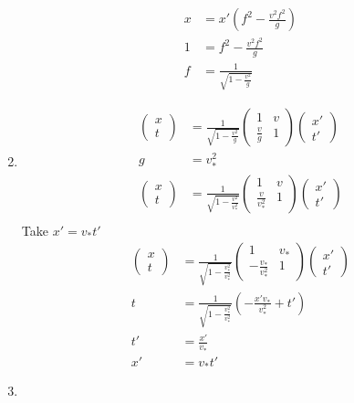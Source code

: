 \documentclass[11pt,letterpaper, twocolumn]{article}
\begin{document}
\begin{enumerate}[label=(\alph*)]
\begin{align*}
        x &= x'(f^2-\frac{v^2f^2}{g})\\
        1&=f^2-\frac{v^2f^2}{g}\\
        f&=\frac{1}{\sqrt{1-\frac{v^2}{g}}}
    \end{align*}
    \item\begin{align*}
        \begin{pmatrix}x\\t\end{pmatrix}&= \frac{1}{\sqrt{1-\frac{v^2}{g}}}\begin{pmatrix}1 & v \\ \frac{v}{g} & 1\end{pmatrix}\begin{pmatrix}x'\\t'\end{pmatrix}\\
        g&=v_*^2\\
        \begin{pmatrix}x\\t\end{pmatrix}&= \frac{1}{\sqrt{1-\frac{v^2}{v_*^2}}}\begin{pmatrix}1 & v \\ \frac{v}{v_*^2} & 1\end{pmatrix}\begin{pmatrix}x'\\t'\end{pmatrix}\\
    \end{align*}
    Take $x'=v_*t'$
    \begin{align*}
        \begin{pmatrix}x\\t\end{pmatrix}&= \frac{1}{\sqrt{1-\frac{v_*^2}{v_*^2}}}\begin{pmatrix}1 & v_* \\ -\frac{v_*}{v_*^2} & 1\end{pmatrix}\begin{pmatrix}x'\\t'\end{pmatrix}\\
        t&= \frac{1}{\sqrt{1-\frac{v_*^2}{v_*^2}}}(-\frac{x'v_*}{v_*^2}+t')\\
        t'&=\frac{x'}{v_*}\\
        x'&=v_*t'
    \end{align*} 
    \item \begin{align*}

\end{align*}
\end{enumerate}
\end{document}
